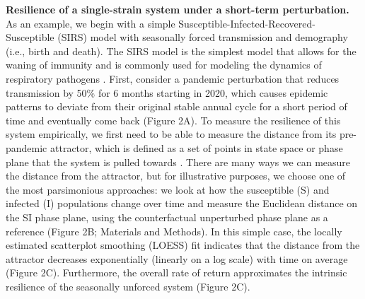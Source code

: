 \documentclass[12pt]{article}
\begin{document}
\textbf{Resilience of a single-strain system under a short-term perturbation.} As an example, we begin with a simple Susceptible-Infected-Recovered-Susceptible (SIRS) model with seasonally forced transmission and demography (i.e., birth and death).
The SIRS model is the simplest model that allows for the waning of immunity and is commonly used for modeling the dynamics of respiratory pathogens \citep{dushoff2004dynamical}.
First, consider a pandemic perturbation that reduces transmission by 50\% for 6 months starting in 2020, which causes epidemic patterns to deviate from their original stable annual cycle for a short period of time and eventually come back (Figure 2A).
To measure the resilience of this system empirically, we first need to be able to measure the distance from its pre-pandemic attractor, which is defined as a set of points in state space or phase plane that the system is pulled towards \citep{hastings1993chaos}.
There are many ways we can measure the distance from the attractor, but for illustrative purposes, we choose one of the most parsimonious approaches: we look at how the susceptible (S) and infected (I) populations change over time and measure the Euclidean distance on the SI phase plane, using the counterfactual unperturbed phase plane as a reference (Figure 2B; Materials and Methods).
In this simple case, the locally estimated scatterplot smoothing (LOESS) fit indicates that the distance from the attractor decreases exponentially (linearly on a log scale) with time on average (Figure 2C).
Furthermore, the overall rate of return approximates the intrinsic resilience of the seasonally unforced system (Figure 2C).
\end{document}
